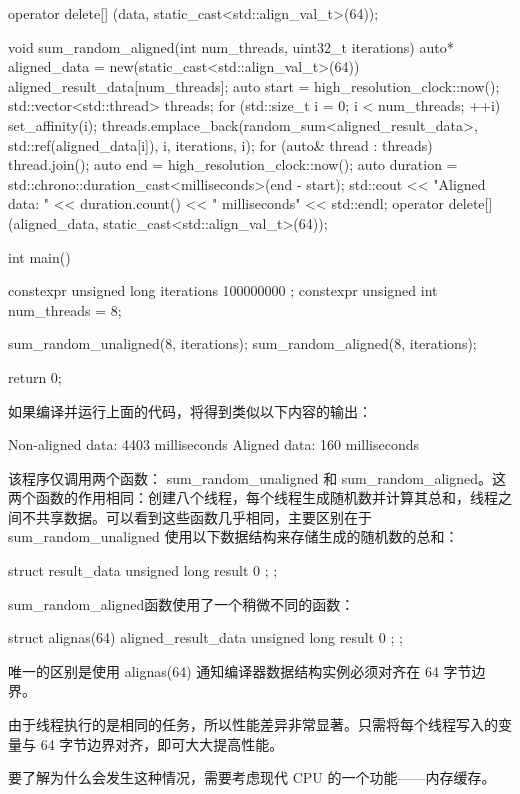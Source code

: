 \begin{cpp}
{    operator delete[] (data, static_cast<std::align_val_t>(64));
}

void sum_random_aligned(int num_threads, uint32_t iterations) {
    auto* aligned_data = new(static_cast<std::align_val_t>(64))
    aligned_result_data[num_threads];
    auto start = high_resolution_clock::now();
    std::vector<std::thread> threads;
    for (std::size_t i = 0; i < num_threads; ++i) {
        set_affinity(i);
        threads.emplace_back(random_sum<aligned_result_data>, std::ref(aligned_data[i]), i, iterations, i);
    }
    for (auto& thread : threads) {
        thread.join();
    }
    auto end = high_resolution_clock::now();
    auto duration = std::chrono::duration_cast<milliseconds>(end - start);
    std::cout << "Aligned data: " << duration.count() << " milliseconds" << std::endl;
    operator delete[] (aligned_data, static_cast<std::align_val_t>(64));
}

int main() {
    constexpr unsigned long iterations{ 100000000 };
    constexpr unsigned int num_threads = 8;

    sum_random_unaligned(8, iterations);
    sum_random_aligned(8, iterations);

    return 0;
}
\end{cpp}

如果编译并运行上面的代码，将得到类似以下内容的输出：

\begin{shell}
Non-aligned data: 4403 milliseconds
Aligned data: 160 milliseconds
\end{shell}

该程序仅调用两个函数： sum\_random\_unaligned 和 sum\_random\_aligned。这两个函数的作用相同：创建八个线程，每个线程生成随机数并计算其总和，线程之间不共享数据。可以看到这些函数几乎相同，主要区别在于 sum\_random\_unaligned 使用以下数据结构来存储生成的随机数的总和：

\begin{cpp}
struct result_data {
    unsigned long result { 0 };
};
\end{cpp}

sum\_random\_aligned函数使用了一个稍微不同的函数：

\begin{cpp}
struct alignas(64) aligned_result_data {
    unsigned long result { 0 };
};
\end{cpp}

唯一的区别是使用 alignas(64) 通知编译器数据结构实例必须对齐在 64 字节边界。

由于线程执行的是相同的任务，所以性能差异非常显著。只需将每个线程写入的变量与 64 字节边界对齐，即可大大提高性能。

要了解为什么会发生这种情况，需要考虑现代 CPU 的一个功能——内存缓存。












